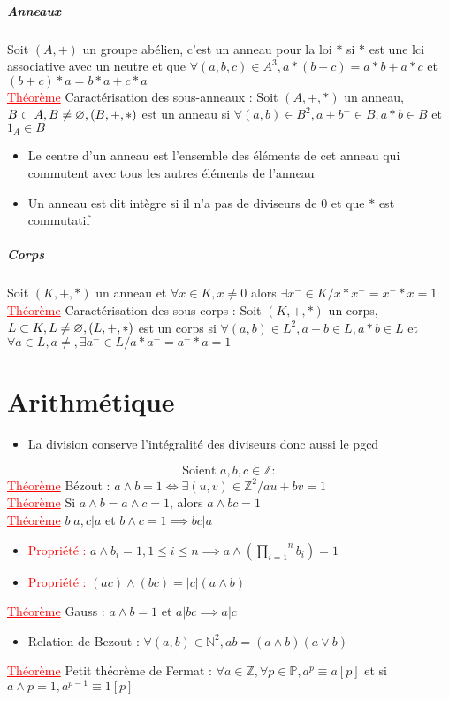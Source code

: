 \documentclass[a4paper, 11pts, french]{article}
\newcommand{\N}{\mathbb{N}}
\newcommand{\Z}{\mathbb{Z}}
\newcommand{\p}{\wedge}
\newcommand{\produit}[2]{\overset{#2}{\underset{#1}{\prod}}}
\newcommand{\thm}{\textcolor{red}{\underline{Théorème} }}
\newcommand{\ppt}{\textcolor{red}{Propriété : }}
\begin{document}
	\subparagraph{Anneaux}
	Soit $(A,+)$ un groupe abélien, c'est un anneau pour la loi $*$ si $*$ est une lci associative avec un neutre et que $\forall (a,b,c)\in A^3, a*(b+c)=a*b+a*c$ et $ (b+c)*a=b*a+c*a$ \\
	 \thm Caractérisation des sous-anneaux : Soit $(A,+,*)$ un anneau, $B \subset A, B\neq \varnothing, \\ (B,+,*)$ est un anneau si $\forall (a,b) \in B^2, a+b^-\in B, a*b \in B$ et $1_A \in B$
	\begin{itemize}
	  \item Le centre d'un anneau est l'ensemble des éléments de cet anneau qui commutent avec tous les autres éléments de l'anneau
	  \item Un anneau est dit intègre si il n'a pas de diviseurs de 0 et que $*$ est commutatif
	\end{itemize}

	\subparagraph{Corps}
	Soit $(K,+,*)$ un anneau et $\forall x \in K, x\neq0$ alors $\exists x^- \in K / x*x^-=x^-*x=1$
	\thm Caractérisation des sous-corps : Soit $(K,+,*)$ un corps, $L \subset K, L\neq \varnothing, \\ (L,+,*)$ est un corps si $\forall (a,b) \in L^2, a-b \in L, a*b \in L$ et $\forall a\in L, a\neq, \exists a^- \in L / a*a^-=a^-*a=1$

	\section{Arithmétique}
	\begin{itemize}
	  \item La division conserve l'intégralité des diviseurs donc aussi le pgcd
	\end{itemize}
	$$\text{Soient } a,b,c \in \Z :$$
	 \thm Bézout : $a \p b=1 \iff \exists (u,v) \in \Z^2 / au+bv=1$ \\
	 \thm Si $a \p b= a \p c = 1$, alors $a \p bc =1$ \\
	 \thm $b|a, c|a$ et $b\p c =1 \implies bc|a$
	\begin{itemize}
	  \item \ppt $a \p b_i=1, 1 \leqslant i \leqslant n \implies a\p (\produit{i=1}{n} b_i)=1$
	  \item \ppt $(ac)\p(bc)=|c|(a \p b)$
	\end{itemize}
	 \thm Gauss : $a \p b = 1$ et $a|bc \implies a|c$
	\begin{itemize}
	  \item Relation de Bezout : $\forall (a,b) \in \N^2, ab=(a \p b)(a \vee b)$
	\end{itemize}
	 \thm Petit théorème de Fermat : $\forall a \in \Z, \forall p \in \mathbb{P}, a^p \equiv a[p]$ et si $a \p p=1, a^{p-1} \equiv 1[p]$
\end{document}
